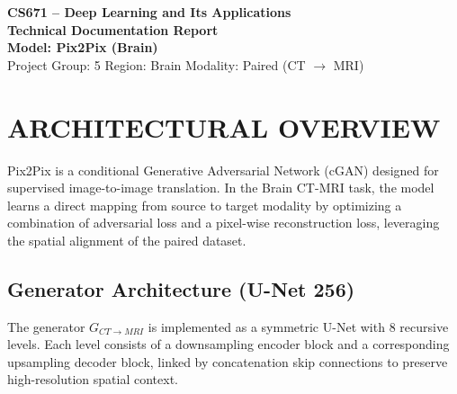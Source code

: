 \documentclass[10pt,a4paper]{article}
\begin{document}
\begin{tcolorbox}[
  enhanced,
  colback=softbg,
  colframe=brand,
  boxrule=0.9pt,
  arc=2mm,
  left=5pt,right=5pt,top=5pt,bottom=5pt
]
\centering
{\Large\bfseries\color{brand} CS671 -- Deep Learning and Its Applications}\\[2pt]
{\large\bfseries Technical Documentation Report}\\[6pt]
{\normalsize\bfseries Model: Pix2Pix (Brain)}\\[4pt]
\small
Project Group: 5 \quad Region: Brain \quad Modality: Paired (CT $\to$ MRI)
\end{tcolorbox}

\section{ARCHITECTURAL OVERVIEW}
Pix2Pix is a conditional Generative Adversarial Network (cGAN) designed for supervised image-to-image translation. In the Brain CT-MRI task, the model learns a direct mapping from source to target modality by optimizing a combination of adversarial loss and a pixel-wise reconstruction loss, leveraging the spatial alignment of the paired dataset.

\subsection{Generator Architecture (U-Net 256)}
The generator $G_{CT \to MRI}$ is implemented as a symmetric U-Net with 8 recursive levels. Each level consists of a downsampling encoder block and a corresponding upsampling decoder block, linked by concatenation skip connections to preserve high-resolution spatial context.
\end{document}
